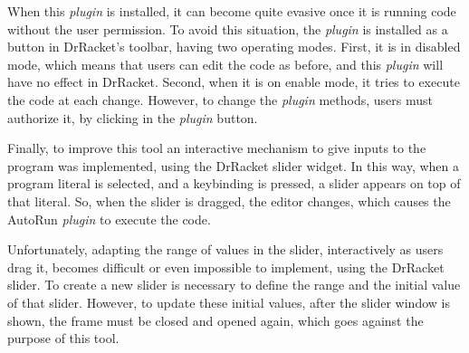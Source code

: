 When this \textit{plugin} is installed, it can become quite evasive once it is running code without the user permission. To avoid this situation, the \textit{plugin} is installed as a button in DrRacket's toolbar, having two operating modes. First, it is in disabled mode, which means that users can edit the code as before, and this \textit{plugin} will have no effect in DrRacket. Second, when it is on enable mode, it tries to execute the code at each change. However, to change the \textit{plugin} methods, users must authorize it, by clicking in the \textit{plugin} button.

Finally, to improve this tool an interactive mechanism to give inputs to the program was implemented, using the DrRacket slider widget. In this way, when a program literal is selected, and a keybinding is pressed, a slider appears on top of that literal. So, when the slider is dragged, the editor changes, which causes the AutoRun \textit{plugin} to execute the code. 

Unfortunately, adapting the range of values in the slider, interactively as users drag it, becomes difficult or even impossible to implement, using the DrRacket slider. To create a new slider is necessary to define the range and the initial value of that slider. However, to update these initial values, after the slider window is shown, the frame must be closed and opened again, which goes against the purpose of this tool.